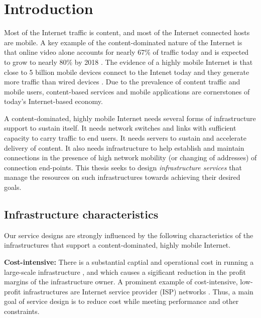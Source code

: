 \chapter{Introduction}

Most of the Internet traffic is content, and most of the Internet connected hosts are mobile. A key example of the content-dominated nature of the Internet is that online video alone accounts for nearly 67\% of traffic today and is expected to grow to nearly 80\% by 2018 \cite{cisco-videogrowth}. The evidence of a highly mobile Internet is that close to 5 billion mobile devices connect to the Intenet today and they generate more traffic than wired devices \cite{cisco-vni}. Due to the prevalence of content traffic and mobile users, content-based services and mobile applications are cornerstones of today's Internet-based economy.

A content-dominated, highly mobile Internet needs several forms of infrastructure support to sustain itself. It needs network switches and links with sufficient capacity to carry traffic to end users. It needs servers to sustain and accelerate delivery of content. It also needs  infrastructure to help establish and maintain connections in the presence of high network mobility (or changing of addresses) of connection end-points. This thesis seeks to design \emph{infrastructure services} that manage the resources on such infrastructures towards achieving their desired goals.




\section{Infrastructure characteristics}

Our service designs are strongly influenced by the following characteristics of the infrastructures that support a content-dominated, highly mobile Internet.

\textbf{Cost-intensive:} There is a substantial captial and operational cost in running a large-scale infrastructure \cite{greenberg2008cost}, and which causes a sigificant reduction in the profit margins of the infrastructure owner. A prominent example of cost-intensive, low-profit infrastructures are Internet service provider (ISP) networks \cite{isp-low-profit}. Thus, a main goal of service design is to reduce cost while meeting performance and other constraints. 


